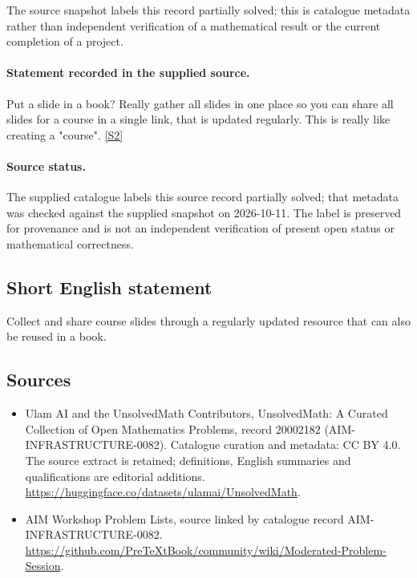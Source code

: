 \documentclass[11pt]{article}
\begin{document}
The source snapshot labels this record partially solved; this is catalogue metadata rather than independent verification of a mathematical result or the current completion of a project.
\paragraph{Statement recorded in the supplied source.}
Put a slide in a book? Really gather all slides in one place so you can share all slides for a course in a single link, that is updated regularly. This is really like creating a "course". \href{https://github.com/PreTeXtBook/community/wiki/Moderated-Problem-Session}{[S2]}
\paragraph{Source status.}
The supplied catalogue labels this source record partially solved; that metadata was checked against the supplied snapshot on 2026-10-11. The label is preserved for provenance and is not an independent verification of present open status or mathematical correctness.
\subsection{Short English statement}
Collect and share course slides through a regularly updated resource that can also be reused in a book.
\subsection{Sources}
\begin{itemize}
\item[S1] Ulam AI and the UnsolvedMath Contributors, UnsolvedMath: A Curated Collection of Open Mathematics Problems, record 20002182 (AIM-INFRASTRUCTURE-0082). Catalogue curation and metadata: CC BY 4.0. The source extract is retained; definitions, English summaries and qualifications are editorial additions.
\url{https://huggingface.co/datasets/ulamai/UnsolvedMath}.
\item[S2] AIM Workshop Problem Lists, source linked by catalogue record AIM-INFRASTRUCTURE-0082.
\url{https://github.com/PreTeXtBook/community/wiki/Moderated-Problem-Session}.
\end{itemize}
\end{document}
